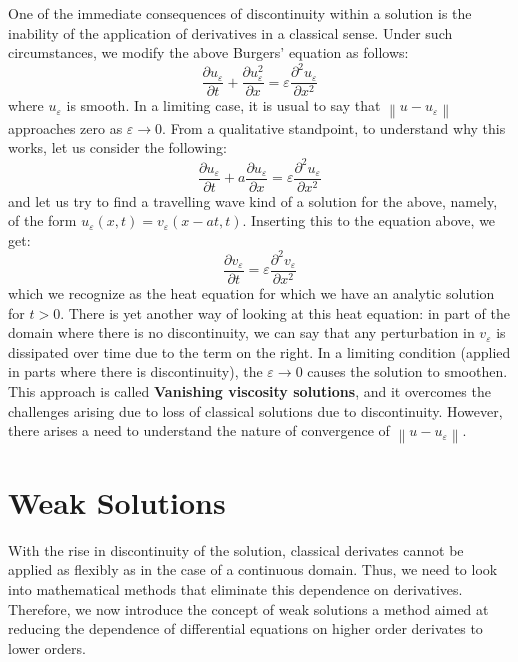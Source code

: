 \documentclass[11pt, a4paper]{report}
\begin{document}
One of the immediate consequences of discontinuity within a solution is the inability of the application of derivatives
in a classical sense. Under such circumstances, we modify the above Burgers' equation as follows:
\begin{equation*}
    \frac{\partial u_{\varepsilon}}{\partial t} + \frac{\partial u_{\varepsilon}^{2}}{\partial x} = \varepsilon\frac{\partial^{2}u_{\varepsilon}}{\partial x^{2}}
\end{equation*}
where $u_{\varepsilon}$ is smooth. In a limiting case, it is usual to say that $\left\|u - u_{\varepsilon}\right\|$
approaches zero as $\varepsilon\rightarrow 0$. From a qualitative standpoint, to understand why this works, let us 
consider the following:
\begin{equation*}
    \frac{\partial u_{\varepsilon}}{\partial t} + a\frac{\partial u_{\varepsilon}}{\partial x} = \varepsilon\frac{\partial^{2}u_{\varepsilon}}{\partial x^{2}}
\end{equation*}
and let us try to find a travelling wave kind of a solution for the above, namely, of the form $u_{\varepsilon}(x, t) = v_{\varepsilon}(x - at, t)$.
Inserting this to the equation above, we get:
\begin{equation*}
    \frac{\partial v_{\varepsilon}}{\partial t} = \varepsilon\frac{\partial^{2} v_{\varepsilon}}{\partial x^{2}}
\end{equation*}
which we recognize as the heat equation for which we have an analytic solution for $t>0$. There is yet another way 
of looking at this heat equation: in part of the domain where there is no discontinuity, we can say that any 
perturbation in $v_{\varepsilon}$ is dissipated over time due to the term on the right. In a limiting condition (applied
in parts where there is discontinuity), the $\varepsilon\rightarrow 0$ causes the solution to smoothen. This approach
is called {\bfseries Vanishing viscosity solutions}, and it overcomes the challenges arising due to loss of classical
solutions due to discontinuity. However, there arises a need to understand the nature of convergence of 
$\left\|u - u_{\varepsilon}\right\|$.

\section{Weak Solutions}
With the rise in discontinuity of the solution, classical derivates cannot be applied as flexibly as in the case of
a continuous domain. Thus, we need to look into mathematical methods that eliminate this dependence on derivatives.
Therefore, we now introduce the concept of weak solutions \textemdash a method aimed at reducing the dependence of 
differential equations on higher order derivates to lower orders. 
\end{document}
